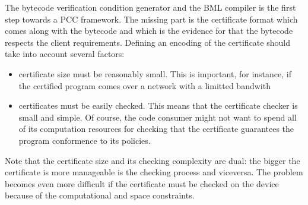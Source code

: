 The bytecode verification condition generator and the BML compiler is the first step towards a PCC framework. 
The missing  part is  the certificate format which comes along with the bytecode and which  is the evidence for 
that the bytecode respects the client requirements. Defining an encoding of the certificate should take into account several factors:
\begin{itemize} 
  \item certificate size must be reasonably small. This is important, for instance,  if the certified program comes over a network with a limitted bandwith
  \item certificates must be easily checked. This means that the certificate checker is  small and simple.
	       Of course, the code consumer might not want to spend all of its computation 
	      resources for checking that the certificate guarantees the program conformence to its policies.     
\end{itemize}

Note that the certificate size and its checking complexity are dual: the bigger the certificate is more manageable is the checking process and viceversa. 
The problem becomes even more difficult if the certificate must be checked on the device because of the computational and space constraints.
 


  
%  
% 
%        
%     



